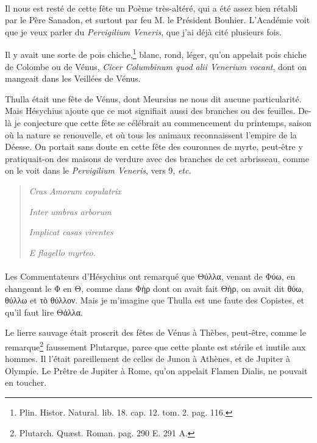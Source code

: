 \documentclass[a4paper, 11pt, oneside, polutonikogreek, french]{article}
\begin{document}
\paragraph{}
Il nous est resté de cette fête un Poème très-altéré, qui a été assez bien rétabli par le Père Sanadon, et surtout par feu M. le Président Bouhier. L'Académie voit que je veux parler du \emph{Pervigilium Veneris}, que j'ai déjà cité plusieurs fois.

Il y avait une sorte de pois chiche,\footnote{Plin. Histor. Natural. lib. 18. cap. 12. tom. 2. pag. 116.} blanc, rond, léger, qu'on appelait pois chiche de Colombe ou de Vénus, \emph{Cicer Columbinum quod alii Venerium vocant}, dont on mangeait dans les Veillées de Vénus.

Thulla était une fête de Vénus, dont Meursius ne nous dit aucune particularité. Mais Hésychius ajoute que ce mot signifiait aussi des branches ou des feuilles. De-là je conjecture que cette fête se célébrait au commencement du printemps, saison où la nature se renouvelle, et où tous les animaux reconnaissent l'empire de la Déesse. On portait sans doute en cette fête des couronnes de myrte, peut-être y pratiquait-on des maisons de verdure avec des branches de cet arbrisseau, comme on le voit dans le \emph{Pervigilium Veneris}, vers 9, \emph{etc.}
\begin{quotation}
\emph{Cras Amorum copulatrix}

\hspace*{5mm}\emph{Inter umbras arborum}

\emph{Implicat casas virentes}

\hspace*{5mm}\emph{E flagello myrteo.}
\end{quotation}
\paragraph{}
Les Commentateurs d'Hésychius ont remarqué que Θύλλα, venant de Φύω, en changeant le Φ en Θ, comme dans Φὴρ dont on avait fait Θὴρ, on avait dit θύω, θύλλω et τὸ θύλλον. Mais je m'imagine que Thulla est une faute des Copistes, et qu'il faut lire Θάλλα.

Le lierre sauvage était proscrit des fêtes de Vénus à Thèbes, peut-être, comme le remarque\footnote{Plutarch. Quæst. Roman. pag. 290 E. 291 A.} faussement Plutarque, parce que cette plante est stérile et inutile aux hommes. Il l'était pareillement de celles de Junon à Athènes, et de Jupiter à Olympie. Le Prêtre de Jupiter à Rome, qu'on appelait Flamen Dialis, ne pouvait en toucher.
\end{document}
